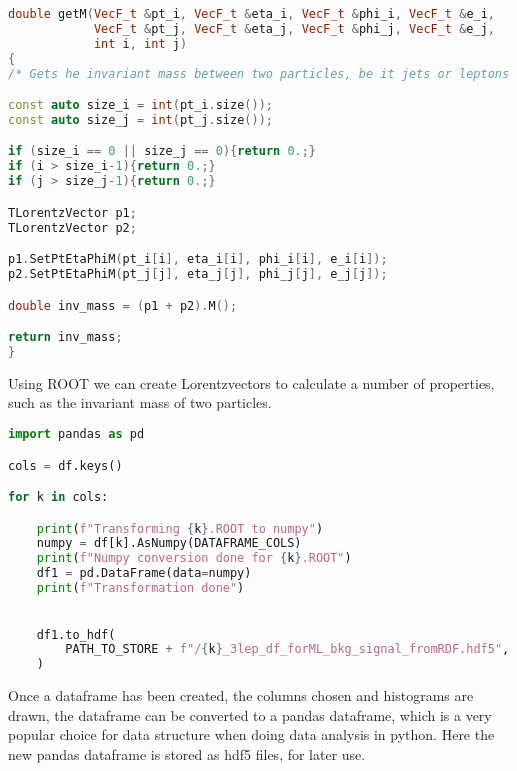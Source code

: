 \begin{lstlisting}[language=C++, style=cppstyle, label={code:cpp_func_example}]
double getM(VecF_t &pt_i, VecF_t &eta_i, VecF_t &phi_i, VecF_t &e_i,
            VecF_t &pt_j, VecF_t &eta_j, VecF_t &phi_j, VecF_t &e_j,
            int i, int j)
{
/* Gets he invariant mass between two particles, be it jets or leptons */

const auto size_i = int(pt_i.size());
const auto size_j = int(pt_j.size());

if (size_i == 0 || size_j == 0){return 0.;}
if (i > size_i-1){return 0.;}
if (j > size_j-1){return 0.;}

TLorentzVector p1;
TLorentzVector p2;

p1.SetPtEtaPhiM(pt_i[i], eta_i[i], phi_i[i], e_i[i]);
p2.SetPtEtaPhiM(pt_j[j], eta_j[j], phi_j[j], e_j[j]);

double inv_mass = (p1 + p2).M();

return inv_mass;
}
\end{lstlisting}
Using ROOT we can create Lorentzvectors to calculate a number of properties, such as the invariant mass of two particles.




\begin{lstlisting}[language=Python, style=pythonstyle, label={code:python_func_example}]
import pandas as pd 

cols = df.keys()

for k in cols:

    print(f"Transforming {k}.ROOT to numpy")
    numpy = df[k].AsNumpy(DATAFRAME_COLS)
    print(f"Numpy conversion done for {k}.ROOT")
    df1 = pd.DataFrame(data=numpy)
    print(f"Transformation done")
    

    df1.to_hdf(
        PATH_TO_STORE + f"/{k}_3lep_df_forML_bkg_signal_fromRDF.hdf5", "mini"
    )

\end{lstlisting}


Once a dataframe has been created, the columns chosen and histograms are drawn, the dataframe can be converted to a pandas dataframe, which is a very popular choice
for data structure when doing data analysis in python. Here the new pandas dataframe is stored as hdf5\cite{hdf5} files, for later use. 